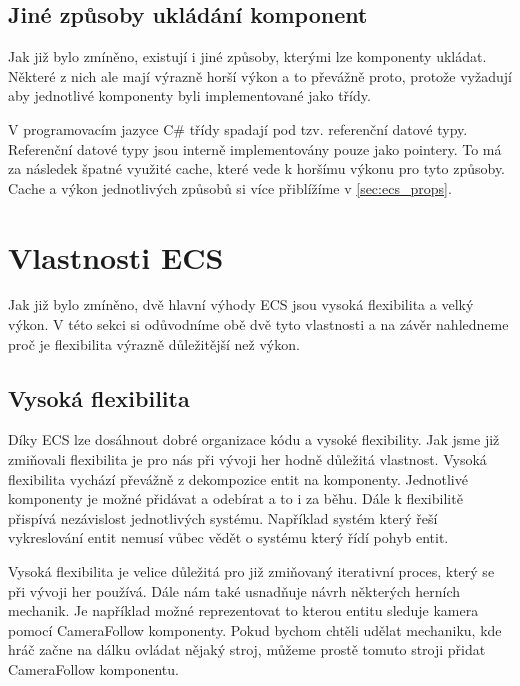 


\subsection{Jiné způsoby ukládání komponent}
Jak již bylo zmíněno, existují i jiné způsoby, kterými lze komponenty ukládat. Některé z nich ale mají výrazně horší výkon a to převážně proto, protože vyžadují aby jednotlivé komponenty byli implementované jako třídy.

V programovacím jazyce C\# třídy spadají pod tzv. referenční datové typy. Referenční datové typy jsou interně implementovány pouze jako pointery. To má za následek špatné využité cache, které vede k horšímu výkonu pro tyto způsoby. Cache a výkon jednotlivých způsobů si více přiblížíme v \ref{sec:ecs_props}.


\section{Vlastnosti ECS}
Jak již bylo zmíněno, dvě hlavní výhody ECS jsou vysoká flexibilita a velký výkon. V této sekci si odůvodníme obě dvě tyto vlastnosti a na závěr nahledneme proč je flexibilita výrazně důležitější než výkon.

\subsection{Vysoká flexibilita}

Díky ECS lze dosáhnout dobré organizace kódu a vysoké flexibility. Jak jsme již zmiňovali flexibilita je pro nás při vývoji her hodně důležitá vlastnost. Vysoká flexibilita vychází převážně z dekompozice entit na komponenty. Jednotlivé komponenty je možné přidávat a odebírat a to i za běhu. Dále k flexibilitě přispívá nezávislost jednotlivých systému. Například systém který řeší vykreslování entit nemusí vůbec vědět o systému který řídí pohyb entit.

Vysoká flexibilita je velice důležitá pro již zmiňovaný iterativní proces, který se při vývoji her používá. Dále nám také usnadňuje návrh některých herních mechanik. Je například možné reprezentovat to kterou entitu sleduje kamera pomocí CameraFollow komponenty. Pokud bychom chtěli udělat mechaniku, kde hráč začne na dálku ovládat nějaký stroj, můžeme prostě tomuto stroji přidat CameraFollow komponentu.

